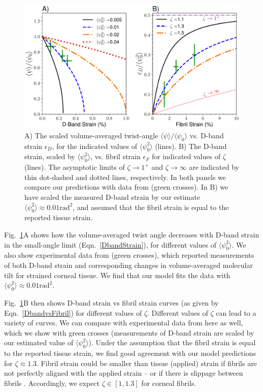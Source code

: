 \documentclass[preprint,12pt]{elsarticle}
\begin{document}
\begin{figure}[h] 
\centering
  \includegraphics[width=14cm]{Figure_1.pdf}
  \caption{A) The scaled volume-averaged twist-angle $\langle\psi\rangle/\langle\psi_0\rangle$ vs. D-band strain $\epsilon_D$, for the indicated values of $\langle\psi_0^2\rangle$ (lines). B) The D-band strain, scaled by $\langle\psi_0^2\rangle$, vs. fibril strain $\epsilon_F$ for indicated values of $\zeta$ (lines). The asymptotic limits of $\zeta \rightarrow 1^+$ and $\zeta \rightarrow \infty$ are indicated by thin dot-dashed and dotted lines, respectively. In both panels we compare our predictions with data from \cite{Bell:2018} (green crosses). In B) we have scaled the measured D-band strain by our estimate $\langle\psi_0^2\rangle\approx0.01\mathrm{rad}^2$, and assumed that the fibril strain is equal to the reported tissue strain.}
  \label{fig:dbandstrain}
\end{figure}

Fig.~\ref{fig:dbandstrain}A shows how the volume-averaged twist angle decreases with D-band strain in the small-angle limit (Eqn.~\ref{DbandStrain}), for different values of $\langle\psi_0^2\rangle$. We also show experimental data from \cite{Bell:2018} (green crosses), which reported measurements of both D-band strain and corresponding changes in volume-averaged molecular tilt for strained corneal tissue. We find that our model  fits the data with $\langle\psi_0^2\rangle\approx 0.01\mathrm{rad}^2$. 

Fig.~\ref{fig:dbandstrain}B then shows D-band strain vs fibril strain curves (as given by Eqn.~\ref{DbandvsFibril}) for different values of $\zeta$. Different values of $\zeta$ can lead to a variety of curves. We can compare with experimental data from \cite{Bell:2018} here as well, which we show with green crosses (measurements of D-band strain are  scaled by our estimated value of $\langle\psi_0^2\rangle$). Under the assumption that the fibril strain is equal to the reported tissue strain, we find good agreement with our model predictions for $\zeta\approx1.3$. Fibril strain could be smaller than tissue (applied) strain if fibrils are not perfectly aligned with the applied strain -- or if there is  slippage between fibrils \cite{Screen:2004}. Accordingly, we expect $\zeta\in[1,1.3]$ for corneal fibrils. 
\end{document}
